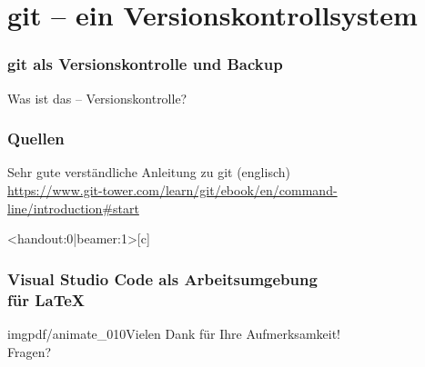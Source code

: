 \documentclass[t, %
							xcolor=dvipsnames,%
							hyperref={bookmarks,colorlinks},%
							]%
							{beamer}
\begin{document}
	\section{git – ein Versionskontrollsystem}
	\label{sec:git-vcs}
	\begin{frame}
		\frametitle{git als Versionskontrolle und Backup}
		Was ist das – Versionskontrolle?
	\end{frame}

	\begin{frame}
		\frametitle{Quellen}
		Sehr gute verständliche Anleitung zu git (englisch)\\
		\url{https://www.git-tower.com/learn/git/ebook/en/command-line/introduction\#start}
	\end{frame}
	
%
		\begin{frame}<handout:0|beamer:1>[c]
		    \frametitle{Visual Studio Code als Arbeitsumgebung \\für \LaTeX}
								{imgpdf/animate_}{0}{10}\Large{Vielen Dank für Ihre Aufmerksamkeit!}\\[1.2\baselineskip]
				\centering
				\Huge{Fragen?}
		\end{frame}
\end{document}
